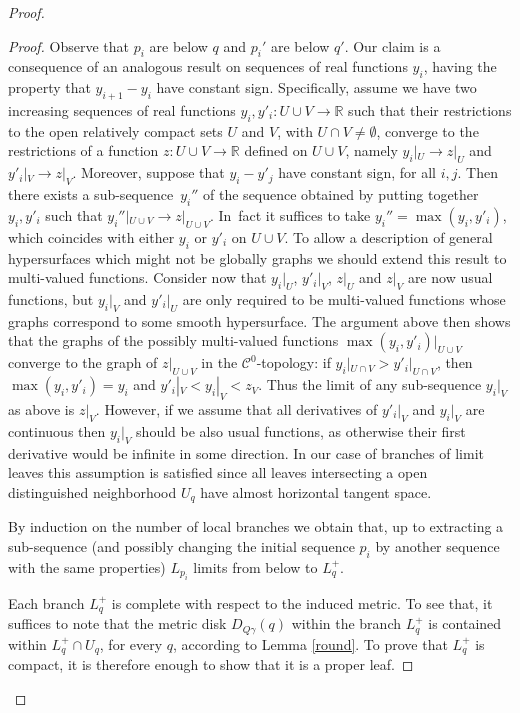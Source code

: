 \documentclass[10pt]{amsart}
\let\mathcal\mathscr
\theoremstyle{definition}
\theoremstyle{remark}
\numberwithin{equation}{section}
\newcommand{\RR}{\mathbb R}
\begin{document}
\begin{proof}
\begin{proof}
Observe that $p_i$ are below $q$ and $p_i'$ are below $q'$.
Our claim is a consequence of an analogous result on sequences of real functions $y_i$,
having the property that $y_{i+1}-y_i$ have constant sign.
Specifically, assume we have two increasing
sequences of real functions $y_i,y'_i:U\cup V\to \RR$ such that their restrictions to the
open relatively compact sets $U$ and $V$,
with $U\cap V\neq\emptyset$, converge to the restrictions of a function
$z:U\cup V\to \RR$ defined on $U\cup V$, namely
${y_i}|_U\to z|_U$ and ${y'_i}|_V\to z|_V$. Moreover, suppose that
$y_i-y'_j$ have constant sign, for all $i,j$. Then there exists a sub-sequence~$y_i''$ of the sequence obtained by putting together $y_i, y'_i$
such that ${y_i''}|_{U\cup V}\to z|_{U\cup V}$. In~fact it suffices to take
$y_i''=\max(y_i,y'_i)$, which coincides with either $y_i$ or $y'_i$ on $U\cup V$.
To allow a description of general hypersurfaces which might not be globally graphs we should
extend this result to multi-valued functions. Consider now that
${y_i}|_U$, ${y'_i}|_V$, $z|_U$ and $z|_V$ are now usual functions, but ${y_i}|_V$ and ${y'_i}|_U$
are only required to be multi-valued functions whose graphs correspond to some smooth hypersurface.
The argument above then shows that the graphs of the possibly multi-valued functions
$\max(y_i,y'_i)|_{U\cup V}$ converge to the graph of $z|_{U\cup V}$ in the ${\mathcal C}^0$-topology:
if ${y_i}|_{U\cap V} > {y'_i}|_{U\cap V}$, then $\max(y_i,y'_i)=y_i$ and
${y'_i}|_V < {y_i}|_V < z_V$. Thus the limit of any sub-sequence ${y_i}|_V$ as above is $z|_V$.
However, if we assume that all derivatives of ${y'_i}|_V$ and ${y_i}|_V$ are continuous
then ${y_i}|_V$ should be also usual functions, as otherwise their first derivative would be infinite
in some direction. In our case of branches of limit leaves this assumption is satisfied since
all leaves intersecting a open distinguished neighborhood $U_q$ have almost horizontal tangent space.

By induction on the number of local branches
we obtain that, up to extracting a sub-sequence (and possibly changing the initial
sequence $p_i$ by another sequence with the same properties) $L_{p_i}$ limits from below to $L_q^+$.

Each branch $L_q^+$ is complete with respect to the induced metric. To see that, it suffices
to note that the metric disk $D_{Q\gamma}(q)$ within the branch
$L_q^+$ is contained within $L^+_{q}\cap U_{q}$, for every $q$,
according to Lemma \ref{round}.
To prove that $L_q^+$ is compact, it is therefore enough to show that it is a proper leaf.


\end{proof}
\end{proof}
\end{document}
